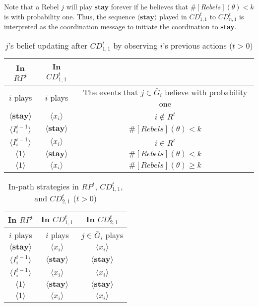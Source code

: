 \documentclass[12pt,letter]{article}
\theoremstyle{definition}
\theoremstyle{remark}
\theoremstyle{claim}
\begin{document}
Note that a Rebel $j$ will play \textbf{stay} forever if he believes that $\#[Rebels](\theta)< k$ is with probability one. Thus, the sequence $\langle \textbf{stay} \rangle$ played in $CD^t_{1,1}$ to $CD^t_{n,1}$ is interpreted as the coordination message to initiate the coordination to \textbf{stay}.

\begin{table}[ht]
\caption{$j$'s belief updating after $CD^t_{1,1}$ by observing $i$'s previous actions  ($t>0$)}
\label{Table_blf_up_cdt11}
\begin{center}
\begin{tabular}{c c c}
In $RP^t$ 	&  	In $CD^t_{1,1}$		&  \\
\hline
\hline
$i$ plays 		&  	$i$ plays		& The events that $j\in \bar{G}_i$ believe with probability one  \\
\hline
$\langle  \textbf{stay} \rangle$ 	& 	$\langle x_i \rangle$	    & $i\notin R^t$ \\
$\langle  {I^{t-1}_i} \rangle$ 		&  $\langle \textbf{stay} \rangle$		& $\#[Rebels](\theta)< k$     \\
$\langle  {I^{t-1}_i} \rangle$ 		&  $\langle x_i \rangle$		& $i\in R^t$     \\
$\langle 1 \rangle$ 		             &  $\langle \textbf{stay} \rangle$		& $\#[Rebels](\theta)< k$  \\
$\langle 1 \rangle$ 		             &  $\langle x_i \rangle$		&  $\#[Rebels](\theta)\geq k$ 
\end{tabular}
\end{center}
\end{table}



\begin{table}[ht]
\caption{In-path strategies in $RP^t$, $CD^t_{1,1}$, and $CD^t_{2,1}$ ($t>0$)}
\label{Table_stg_cdt21}
\begin{center}
\begin{tabular}{c c c}
In $RP^t$ 	 	&  	In $CD^t_{1,1}$		&  In $CD^t_{2,1}$	\\
\hline
\hline
$i$ plays 		  							&  	$i$ plays									& $j\in \bar{G}_{i}$ plays  \\
\hline
$\langle  \textbf{stay} \rangle$ 	& 	$\langle x_i \rangle$	    & $\langle x_i \rangle$ \\
$\langle  {I^{t-1}_i} \rangle$ 		&  $\langle \textbf{stay} \rangle$		& $\langle \textbf{stay} \rangle$     \\
$\langle  {I^{t-1}_i} \rangle$ 		&  $\langle x_i \rangle$		& $\langle x_i \rangle$     \\
$\langle 1 \rangle$ 		             &  $\langle \textbf{stay} \rangle$		& $\langle \textbf{stay} \rangle$  \\
$\langle 1 \rangle$ 		             &  $\langle x_i \rangle$		&  $\langle x_i \rangle$  
\end{tabular}
\end{center}
\end{table}
\end{document}

